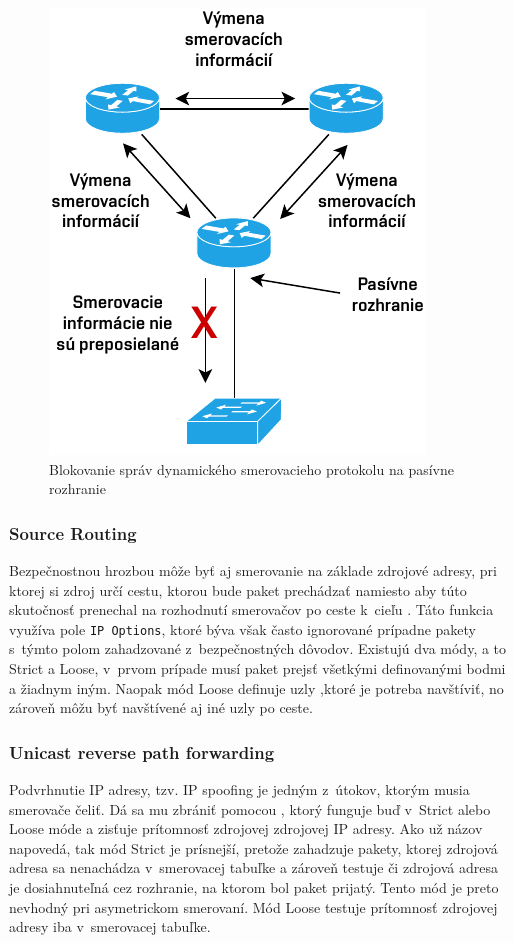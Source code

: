 \begin{figure}[H]
	\begin{center}
		\includegraphics[scale=1]{obrazky/passive-interface.pdf}
	\end{center}
	\caption[Blokovanie správ dynamického smerovacieho protokolu na pasívne rozhranie]{Blokovanie správ dynamického smerovacieho protokolu na pasívne rozhranie}
	\label{fig:passive-int}
\end{figure} 

\subsubsection*{Source Routing}
Bezpečnostnou hrozbou môže byť aj smerovanie na základe zdrojové adresy, pri ktorej si zdroj určí cestu, ktorou bude paket prechádzať namiesto aby túto skutočnosť prenechal na rozhodnutí smerovačov po ceste k~cieľu \cite{CIS_DrTLsgXv24lxeIIM}. Táto funkcia využíva pole \texttt{IP Options}, ktoré býva však často ignorované prípadne pakety s~týmto polom zahadzované z~bezpečnostných dôvodov. Existujú dva módy, a to Strict a Loose, v~prvom prípade musí paket prejsť všetkými definovanými bodmi a žiadnym iným. Naopak mód Loose definuje uzly ,ktoré je potreba navštíviť, no zároveň môžu byť navštívené aj iné uzly po ceste.  

\subsubsection*{Unicast reverse path forwarding}
Podvrhnutie IP adresy, tzv. IP spoofing je jedným z~útokov, ktorým musia smerovače čeliť. Dá sa mu zbrániť pomocou  \cite{Jackson2010}, ktorý funguje buď v~Strict alebo Loose móde a zisťuje prítomnosť zdrojovej zdrojovej IP adresy. Ako už názov napovedá, tak mód Strict je prísnejší, pretože zahadzuje pakety, ktorej zdrojová adresa sa nenachádza v~smerovacej tabuľke a zároveň testuje či zdrojová adresa je dosiahnuteľná cez rozhranie, na ktorom bol paket prijatý. Tento mód je preto nevhodný pri asymetrickom smerovaní. Mód Loose testuje prítomnosť zdrojovej adresy iba v~smerovacej tabuľke. 

